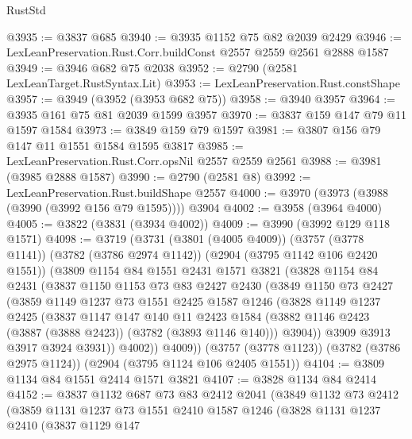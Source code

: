 \begin{lexlean}{RustStd}
\begin{coremodule}
@3935 := @3837 @685
@3940 := @3935 @1152 @75 @82 @2039 @2429
@3946 := LexLeanPreservation.Rust.Corr.buildConst @2557 @2559 @2561 @2888 @1587
@3949 := @3946 @682 @75 @2038
@3952 := @2790 (@2581 LexLeanTarget.RustSyntax.Lit)
@3953 := LexLeanPreservation.Rust.constShape
@3957 := @3949 (@3952 (@3953 @682 @75))
@3958 := @3940 @3957
@3964 := @3935 @161 @75 @81 @2039 @1599 @3957
@3970 := @3837 @159 @147 @79 @11 @1597 @1584
@3973 := @3849 @159 @79 @1597
@3981 := @3807 @156 @79 @147 @11 @1551 @1584 @1595 @3817
@3985 := LexLeanPreservation.Rust.Corr.opsNil @2557 @2559 @2561
@3988 := @3981 (@3985 @2888 @1587)
@3990 := @2790 (@2581 @8)
@3992 := LexLeanPreservation.Rust.buildShape @2557
@4000 := @3970 (@3973 (@3988 (@3990 (@3992 @156 @79 @1595)))) @3904
@4002 := @3958 (@3964 @4000)
@4005 := @3822 (@3831 (@3934 @4002))
@4009 := @3990 (@3992 @129 @118 @1571)
@4098 := @3719
    (@3731
      (@3801 (@4005 @4009))
      (@3757 (@3778 @1141))
      (@3782 (@3786 @2974 @1142))
      (@2904 (@3795 @1142 @106 @2420 @1551))
      (@3809
        @1154
        @84
        @1551
        @2431
        @1571
        @3821
        (@3828
          @1154
          @84
          @2431
          (@3837
            @1150
            @1153
            @73
            @83
            @2427
            @2430
            (@3849
              @1150
              @73
              @2427
              (@3859
                @1149
                @1237
                @73
                @1551
                @2425
                @1587
                @1246
                (@3828
                  @1149
                  @1237
                  @2425
                  (@3837
                    @1147
                    @147
                    @140
                    @11
                    @2423
                    @1584
                    (@3882 @1146 @2423 (@3887 (@3888 @2423)) (@3782 (@3893 @1146 @140)))
                    @3904))
                @3909
                @3913
                @3917
                @3924
                @3931))
            @4002))
        @4009))
    (@3757 (@3778 @1123))
    (@3782 (@3786 @2975 @1124))
    (@2904 (@3795 @1124 @106 @2405 @1551))
@4104 := @3809 @1134 @84 @1551 @2414 @1571 @3821
@4107 := @3828 @1134 @84 @2414
@4152 := @3837
    @1132
    @687
    @73
    @83
    @2412
    @2041
    (@3849
      @1132
      @73
      @2412
      (@3859
        @1131
        @1237
        @73
        @1551
        @2410
        @1587
        @1246
        (@3828
          @1131
          @1237
          @2410
          (@3837
            @1129
            @147

\end{coremodule}
\end{lexlean}
